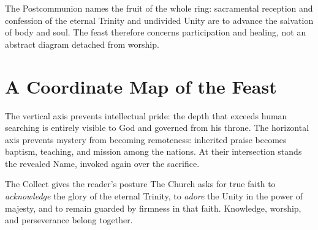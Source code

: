 The Postcommunion names the fruit of the whole ring: sacramental reception and confession of the eternal Trinity and undivided Unity are to advance the salvation of body and soul. The feast therefore concerns participation and healing, not an abstract diagram detached from worship.

\sectionguard
\section*{A Coordinate Map of the Feast}

\begin{center}
\end{center}

The vertical axis prevents intellectual pride: the depth that exceeds human searching is entirely visible to God and governed from his throne. The horizontal axis prevents mystery from becoming remoteness: inherited praise becomes baptism, teaching, and mission among the nations. At their intersection stands the revealed Name, invoked again over the sacrifice.

\begin{massbox}{The Collect gives the reader's posture}
The Church asks for true faith to \emph{acknowledge} the glory of the eternal Trinity, to \emph{adore} the Unity in the power of majesty, and to remain guarded by firmness in that faith. Knowledge, worship, and perseverance belong together.
\end{massbox}

